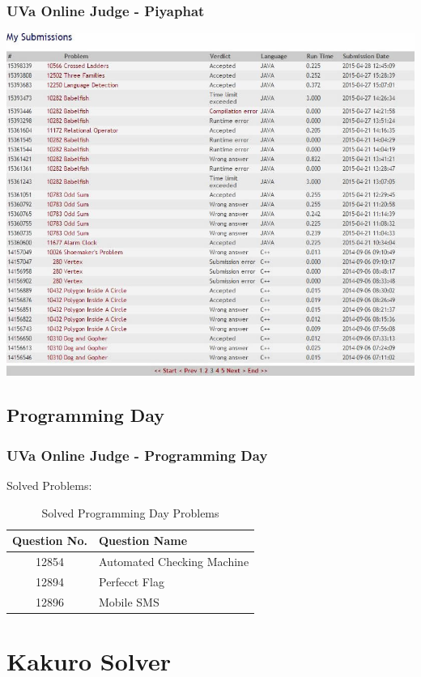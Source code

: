 \documentclass{beamer}
\begin{document}
			\begin{frame}
				\frametitle{UVa Online Judge - Piyaphat}
				\begin{center}
					\includegraphics[scale=0.4]{Submission1-3} 
				\end{center}
			\end{frame}

			\subsection{Programming Day}
			\begin{frame}
				\frametitle{UVa Online Judge - Programming Day}
				Solved Problems:\\
				\begin{table}
					\begin{tabular}{c | l}
						Question No. & Question Name \\
						\hline
						12854 & Automated Checking Machine\\
						12894 & Perfecct Flag\\
						12896 & Mobile SMS
					\end{tabular}
				\caption{Solved Programming Day Problems}
				\end{table}
			\end{frame}



	\section{Kakuro Solver} 
		\begin{frame}
			\sectionpage
		\end{frame}
\end{document}
